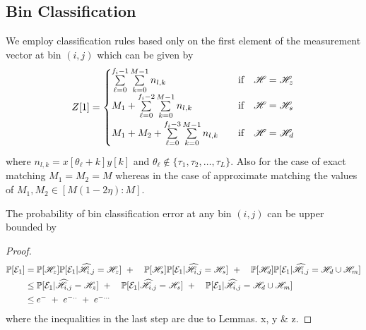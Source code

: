 \subsection{\bf Bin Classification}
We employ classification rules based only on the first element of the measurement vector at bin $(i,j)$ which can be given by
\begin{align}
Z[1]=\begin{cases}
\sum\limits_{\ell=0}^{f_{i}-1}\sum\limits_{k=0}^{M-1} n_{l,k}  & ~~\text{ if } ~~ \msc{H}=\msc{H}_z\label{Eqn:BinCombination}\\
\vspace{\vgap}
M_1+\sum\limits_{\ell=0}^{f_{i}-2}\sum\limits_{k=0}^{M-1} n_{l,k}  & ~~\text{ if } ~~ \msc{H}=\msc{H}_s\\
\vspace{\vgap}
M_1+M_2+\sum\limits_{\ell=0}^{f_{i}-3}\sum\limits_{k=0}^{M-1} n_{l,k}  & ~~\text{ if } ~~ \msc{H}=\msc{H}_d\\
\end{cases}
\end{align}
where $n_{l,k}=x[\theta_{\ell}+k]y[k]$ and $\theta_{\ell}\notin\{\tau_1,\tau_2,\ldots,\tau_L\}$. Also for the case of exact matching $M_1=M_2=M$ whereas in the case of approximate matching the values of $M_1,M_2\in[M(1-2\eta):M]$.

\begin{lemma}
The probability of bin classification error at any bin $(i,j)$ can be upper bounded by
\end{lemma}

\begin{proof}
\begin{align*}
\mathbb{P}[\mathcal{E}_1]&=\mathbb{P}[\mathscr{H}_z]\mathbb{P}[\mathcal{E}_1|\widehat{\mathscr{H}}_{i,j}=\mathscr{H}_z]~+
						\quad \mathbb{P}[\mathscr{H}_s]\mathbb{P}[\mathcal{E}_1|\widehat{\mathscr{H}}_{i,j}=\mathscr{H}_s]~+
						\quad\mathbb{P}[\mathscr{H}_d]\mathbb{P}[\mathcal{E}_1|\widehat{\mathscr{H}}_{i,j}=\mathscr{H}_d \cup \mathscr{H}_m]\\
				&\leq \mathbb{P}[\mathcal{E}_1|\widehat{\mathscr{H}}_{i,j}=\mathscr{H}_z]~+
						\quad \mathbb{P}[\mathcal{E}_1|\widehat{\mathscr{H}}_{i,j}=\mathscr{H}_s]~+
						\quad \mathbb{P}[\mathcal{E}_1|\widehat{\mathscr{H}}_{i,j}=\mathscr{H}_d \cup \mathscr{H}_m]\\
    			&\leq  e^{-} ~+~e^{-..}~+~ e^{-...}						
						\end{align*}
						where the inequalities in the last step are due to Lemmas.  x, y \& z.
\end{proof}

